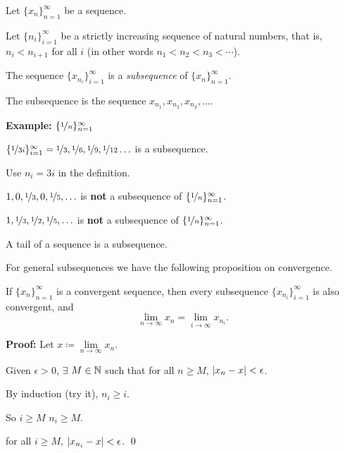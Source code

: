 \documentclass[10pt,aspectratio=149]{beamer}
\begin{document}
\begin{frame}
\begin{definition}
Let $\{ x_n \}_{n=1}^\infty$ be a sequence.

\pause
Let $\{ n_i \}_{i=1}^\infty$ be a strictly increasing sequence of natural
numbers, that is, $n_i < n_{i+1}$ for all $i$ (in other words $n_1 < n_2 < n_3 < \cdots$).  

\pause
The sequence
\quad $\{ x_{n_i} \}_{i=1}^\infty$ \quad
is a \emph{subsequence} of $\{ x_n \}_{n=1}^\infty$.
\end{definition}

\pause

The subsequence is the sequence $x_{n_1},x_{n_2},x_{n_3},\ldots$.

\medskip
\pause

\textbf{Example:} $\{ \nicefrac{1}{n} \}_{n=1}^\infty$

\pause
$\{ \nicefrac{1}{3i} \}_{i=1}^\infty =
\nicefrac{1}{3},\nicefrac{1}{6},\nicefrac{1}{9},\nicefrac{1}{12}\ldots$ is a subsequence.

\pause
Use $n_i = 3i$ in the definition.

\medskip
\pause

$1,0,\nicefrac{1}{3},0, \nicefrac{1}{5},\ldots$ is \textbf{not} a
subsequence of $\{ \nicefrac{1}{n} \}_{n=1}^\infty$.

\medskip
\pause

$1,\nicefrac{1}{3},\nicefrac{1}{2},\nicefrac{1}{5},\ldots$
is \textbf{not} a subsequence of $\{ \nicefrac{1}{n} \}_{n=1}^\infty$.

\end{frame}

\begin{frame}

A tail of a sequence is a subsequence.

\medskip
\pause

For general subsequences we have the following proposition on convergence.

\pause

\begin{proposition}
If $\{ x_n \}_{n=1}^\infty$ is a convergent sequence,
then every subsequence $\{ x_{n_i} \}_{i=1}^\infty$ is also convergent, and
\[
\lim_{n\to \infty} x_n = 
\lim_{i\to \infty} x_{n_i} .
\]
\end{proposition}

\pause

\textbf{Proof:}
Let $x \coloneqq \lim\limits_{n\to \infty} x_n$.

\medskip
\pause
Given $\epsilon > 0$, $\exists$ $M \in {\mathbb{N}}$ such that for all $n \geq M$,
$\left\lvert {x_n - x} \right\rvert < \epsilon$.

\medskip
\pause
By induction (try it), $n_i \geq i$.

\medskip
\pause
So \quad $i \geq M$ \wthus $n_i \geq M$.

\medskip
\pause
\thus \quad for all $i \geq M$, \quad
$\left\lvert {x_{n_i} - x} \right\rvert < \epsilon$.
\qed

\end{frame}
\end{document}

